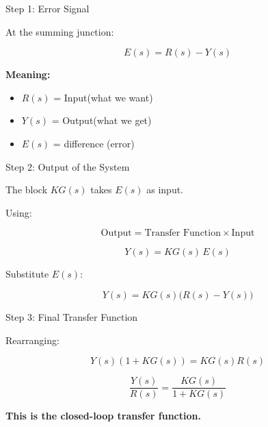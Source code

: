 \documentclass{beamer}
\begin{document}

\begin{frame}{Step 1: Error Signal}

At the summing junction:

\begin{equation}
E(s) = R(s) - Y(s)
\end{equation}

\vspace{0.3cm}

\textbf{Meaning:}
\begin{itemize}
    \item $R(s)$ = Input(what we want)
    \item $Y(s)$ = Output(what we get)
    \item $E(s)$ = difference (error)
\end{itemize}

\end{frame}


\begin{frame}{Step 2: Output of the System}

The block $KG(s)$ takes $E(s)$ as input.

\vspace{0.3cm}

Using:

\begin{equation}
\text{Output} = \text{Transfer Function} \times \text{Input}
\end{equation}

\begin{equation}
Y(s) = KG(s)\,E(s)
\end{equation}

\vspace{0.3cm}

Substitute $E(s)$:

\begin{equation}
Y(s) = KG(s)\big(R(s) - Y(s)\big)
\end{equation}

\end{frame}


\begin{frame}{Step 3: Final Transfer Function}

Rearranging:

\begin{equation}
Y(s)(1 + KG(s)) = KG(s)R(s)
\end{equation}

\begin{equation}
\frac{Y(s)}{R(s)} = \frac{KG(s)}{1 + KG(s)}
\end{equation}

\vspace{0.3cm}

\textbf{This is the closed-loop transfer function.}

\end{frame}
\end{document}
